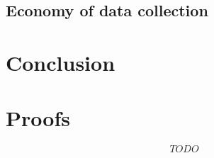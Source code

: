 \documentclass{article}
\begin{document}
\clearpage

\subsection{Economy of data collection}


\clearpage 
\section{Conclusion} 
 
 







\clearpage 
\appendix

\onecolumn 
\section{Proofs}

$$ TODO $$
\end{document}

